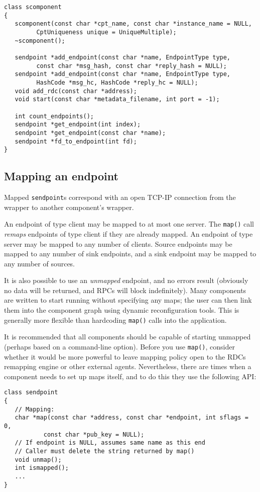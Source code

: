 \documentclass[12pt,a4paper,twoside]{article}
\renewcommand{\_}{\texttt{\symbol{95}}}
\begin{document}
\begin{verbatim}
class scomponent
{
   scomponent(const char *cpt_name, const char *instance_name = NULL,
         CptUniqueness unique = UniqueMultiple);
   ~scomponent();
      
   sendpoint *add_endpoint(const char *name, EndpointType type,
         const char *msg_hash, const char *reply_hash = NULL);
   sendpoint *add_endpoint(const char *name, EndpointType type,
         HashCode *msg_hc, HashCode *reply_hc = NULL);
   void add_rdc(const char *address);   
   void start(const char *metadata_filename, int port = -1);

   int count_endpoints();
   sendpoint *get_endpoint(int index);
   sendpoint *get_endpoint(const char *name);  
   sendpoint *fd_to_endpoint(int fd);
}
\end{verbatim}

\subsection{Mapping an endpoint}

Mapped \verb^sendpoint^s correspond with an open TCP-IP connection
from the wrapper to another component's wrapper.

An endpoint of type client may be mapped to at most one server.
The \verb^map()^ call \textit{remaps} endpoints of type client
if they are already mapped.
An endpoint of type server may be mapped
to any number of clients. Source endpoints may be mapped to any number
of sink endpoints, and a sink endpoint may be mapped to any number of
sources.

It is also possible to use an \textit{unmapped} endpoint, and no
errors result (obviously no data will be returned, and RPCs will
block indefinitely).
Many components are written to start running without specifying any
maps; the user can then link them into the component graph using dynamic
reconfiguration tools. This is generally more flexible than hardcoding
\verb^map()^ calls into the application.

It is recommended that all components should be capable of starting
unmapped (perhaps based on a command-line option).
Before you use \verb^map()^, consider whether it would be more
powerful to leave mapping policy open to the RDCs remapping engine
or other external agents.
Nevertheless, there are times when a component needs to set
up maps itself, and to do this they use the following API:

\begin{verbatim}
class sendpoint
{
   // Mapping: 
   char *map(const char *address, const char *endpoint, int sflags = 0,
           const char *pub_key = NULL);
   // If endpoint is NULL, assumes same name as this end
   // Caller must delete the string returned by map()
   void unmap();
   int ismapped();
   ...
}
\end{verbatim}
\end{document}
